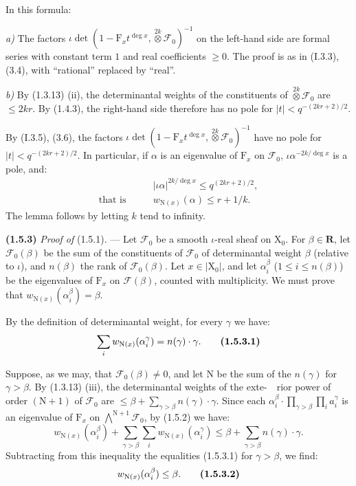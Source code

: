 \documentclass[11pt,leqno]{article}
\newcommand{\Page}[1]{\ifvmode\noindent\else\unskip\ \fi{\footnotesize\textcolor{gray}{[p.\,#1]}}\ \ignorespaces}
\begin{document}
In this formula:

\textit{a)} The factors \(\iota\det(1-\mathrm{F}_x t^{\deg x},\mathop{\otimes}\limits^{2k}\mathcal{F}_0)^{-1}\) on the left-hand side are formal series with constant term \(1\) and real coefficients \(\ge0\). The proof is as in (I.3.3), (3.4), with “rational” replaced by “real”.

\textit{b)} By (1.3.13) (ii), the determinantal weights of the constituents of \(\mathop{\otimes}\limits^{2k}\mathcal{F}_0\) are \(\le2kr\). By (1.4.3), the right-hand side therefore has no pole for \(|t|<q^{-(2kr+2)/2}\).

By (I.3.5), (3.6), the factors \(\iota\det(1-\mathrm{F}_x t^{\deg x},\mathop{\otimes}\limits^{2k}\mathcal{F}_0)^{-1}\) have no pole for \(|t|<q^{-(2kr+2)/2}\). In particular, if \(\alpha\) is an eigenvalue of \(\mathrm{F}_x\) on \(\mathcal{F}_0\), \(\iota\alpha^{-2k/\deg x}\) is a pole, and:
\begin{align*}
&|\iota\alpha|^{2k/\deg x}\le q^{(2kr+2)/2},\\
\text{that is}\qquad &w_{\mathrm{N}(x)}(\alpha)\le r+1/k.
\end{align*}
The lemma follows by letting \(k\) tend to infinity.

\textbf{(1.5.3)} \textit{Proof of} (1.5.1). — Let \(\mathcal{F}_0\) be a smooth \(\iota\)-real sheaf on \(\mathrm{X}_0\). For \(\beta\in\mathbf{R}\), let \(\mathcal{F}_0(\beta)\) be the sum of the constituents of \(\mathcal{F}_0\) of determinantal weight \(\beta\) (relative to \(\iota\)), and \(n(\beta)\) the rank of \(\mathcal{F}_0(\beta)\). Let \(x\in|\mathrm{X}_0|\), and let \(\alpha_i^\beta\) (\(1\le i\le n(\beta)\)) be the eigenvalues of \(\mathrm{F}_x\) on \(\mathcal{F}(\beta)\), counted with multiplicity. We must prove that \(w_{\mathrm{N}(x)}(\alpha_i^\beta)=\beta\).

By the definition of determinantal weight, for every \(\gamma\) we have:
\[
\sum_i w_{\mathrm{N}(x)}(\alpha_i^\gamma)=n(\gamma)\cdot\gamma.
\tag*{\textbf{(1.5.3.1)}}
\]

Suppose, as we may, that \(\mathcal{F}_0(\beta)\ne0\), and let \(\mathrm{N}\) be the sum of the \(n(\gamma)\) for \(\gamma>\beta\). By (1.3.13) (iii), the determinantal weights of the exte-\Page{165}rior power of order \((\mathrm{N}+1)\) of \(\mathcal{F}_0\) are \(\le\beta+\sum\limits_{\gamma>\beta}n(\gamma)\cdot\gamma\). Since each \(\alpha_i^\beta\cdot\prod\limits_{\gamma>\beta}\prod\limits_i a_i^\gamma\) is an eigenvalue of \(\mathrm{F}_x\) on \(\bigwedge\limits^{\mathrm{N}+1}\mathcal{F}_0\), by (1.5.2) we have:
\[
w_{\mathrm{N}(x)}(\alpha_i^\beta)
+\sum_{\gamma>\beta}\sum_i w_{\mathrm{N}(x)}(\alpha_i^\gamma)
\le\beta+\sum_{\gamma>\beta}n(\gamma)\cdot\gamma.
\]
Subtracting from this inequality the equalities (1.5.3.1) for \(\gamma>\beta\), we find:
\[
w_{\mathrm{N}(x)}(\alpha_i^\beta)\le\beta.
\tag*{\textbf{(1.5.3.2)}}
\]
\end{document}
